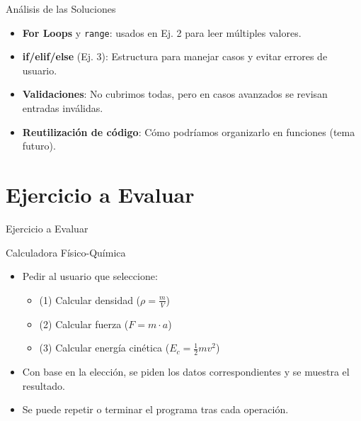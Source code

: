 \documentclass[10pt]{beamer}
\begin{document}
\begin{frame}{Análisis de las Soluciones}
  \begin{itemize}
    \item \textbf{For Loops} y \texttt{range}: usados en Ej. 2 para leer múltiples valores.
    \item \textbf{if/elif/else} (Ej. 3): Estructura para manejar casos y evitar errores de usuario.
    \item \textbf{Validaciones}: No cubrimos todas, pero en casos avanzados se revisan entradas inválidas.
    \item \textbf{Reutilización de código}: Cómo podríamos organizarlo en funciones (tema futuro).
  \end{itemize}
\end{frame}

\section{Ejercicio a Evaluar}
\begin{frame}{Ejercicio a Evaluar}
  \begin{block}{Calculadora Físico-Química}
    \begin{itemize}
      \item Pedir al usuario que seleccione:
        \begin{itemize}
          \item (1) Calcular densidad (\(\rho = \frac{m}{V}\))
          \item (2) Calcular fuerza (\(F = m \cdot a\))
          \item (3) Calcular energía cinética (\(E_c = \frac{1}{2}mv^2\))
        \end{itemize}
      \item Con base en la elección, se piden los datos correspondientes y se muestra el resultado.
      \item Se puede repetir o terminar el programa tras cada operación.
    \end{itemize}
  \end{block}
\end{frame}
\end{document}
